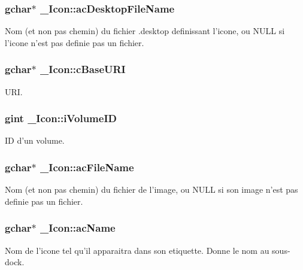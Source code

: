 \subsubsection{\setlength{\rightskip}{0pt plus 5cm}gchar$\ast$ {\bf \_\-Icon::acDesktopFileName}}\label{struct__Icon_5f3113020e0305c64fe6b6e87002b0fb}


Nom (et non pas chemin) du fichier .desktop definissant l'icone, ou NULL si l'icone n'est pas definie pas un fichier. 

\subsubsection{\setlength{\rightskip}{0pt plus 5cm}gchar$\ast$ {\bf \_\-Icon::cBaseURI}}\label{struct__Icon_48bf6db71b3512a68496eaf7aaf9a368}


URI. 

\subsubsection{\setlength{\rightskip}{0pt plus 5cm}gint {\bf \_\-Icon::iVolumeID}}\label{struct__Icon_31acfb1df65427e5626368b2939dc1c2}


ID d'un volume. 

\subsubsection{\setlength{\rightskip}{0pt plus 5cm}gchar$\ast$ {\bf \_\-Icon::acFileName}}\label{struct__Icon_9f3d2853306114af7e4c9c9c3e33f602}


Nom (et non pas chemin) du fichier de l'image, ou NULL si son image n'est pas definie pas un fichier. 

\subsubsection{\setlength{\rightskip}{0pt plus 5cm}gchar$\ast$ {\bf \_\-Icon::acName}}\label{struct__Icon_be3795ee26a0889b47b39d66ebcf6c92}


Nom de l'icone tel qu'il apparaitra dans son etiquette. Donne le nom au sous-dock. 

